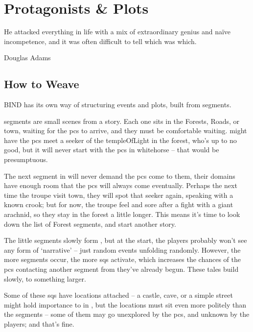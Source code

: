 \chapter{Protagonists \& Plots}
  \epigraph{He attacked everything in life with a mix of extraordinary genius and na\"ive incompetence, and it was often difficult to tell which was which.}{Douglas Adams}
\label{sideQuestIntro}

\section{How to Weave}
\label{sqSummaries}

\begin{multicols}{2}

\noindent
BIND has its own way of structuring events and plots, built from \glspl{segment}.

\Glspl{segment} are small scenes from a story.
Each one sits in the Forests, Roads, or \gls{town}, waiting for the \glspl{pc} to arrive, and they must be comfortable waiting.
 might have the \glspl{pc} meet a \gls{seeker} of the \gls{templeOfLight} in the forest, who's up to no good, but it will never start with the \glspl{pc} in \gls{whitehorse} -- that would be presumptuous.

The next \gls{segment} in  will never demand the \glspl{pc} come to them, their domains have enough room that the \glspl{pc} will always come eventually.
Perhaps the next time the troupe visit town, they will spot that \gls{seeker} again, speaking with a known crook; but for now, the troupe feel and sore after a fight with a giant arachnid, so they stay in the forest a little longer.
This means it's time to look down the list of Forest \glspl{segment}, and start another story.

The little \glspl{segment} slowly form , but at the start, the players probably won't see any form of `narrative' -- just random events unfolding randomly.
However, the more \glspl{segment} occur, the more \glspl{sq} activate, which increases the chances of the \glspl{pc} contacting another \gls{segment} from  they've already begun.
These tales build slowly, to something larger.

Some of these \glspl{sq} have locations attached -- a castle, cave, or a simple street might hold importance to  in , but the locations must sit even more politely than the \glspl{segment} -- some of them may go unexplored by the \glspl{pc}, and unknown by the players; and that's fine.


\end{multicols}
